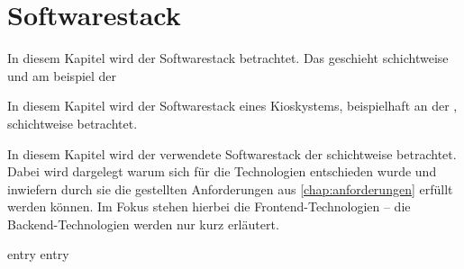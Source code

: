 \chapter{Softwarestack}
\label{chap:softwarestack}

In diesem Kapitel wird der Softwarestack betrachtet. Das geschieht 
schichtweise und am beispiel der \shst{}

In diesem Kapitel wird der Softwarestack eines Kioskystems, beispielhaft
an der \shst{}, schichtweise betrachtet. 

In diesem Kapitel wird der verwendete Softwarestack der \shst{} schichtweise
betrachtet. Dabei wird dargelegt warum sich für die Technologien entschieden
wurde und inwiefern durch sie die gestellten Anforderungen aus \autoref{chap:anforderungen}
erfüllt werden können. Im Fokus stehen hierbei die Frontend-Technologien -- die
Backend-Technologien werden nur kurz erläutert.

{entry}
{entry}
